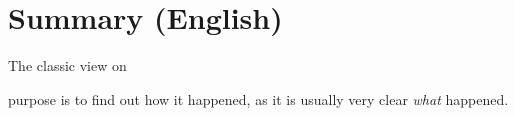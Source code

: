 \chapter{Summary (English)}
The classic view on 



purpose is to find out how it happened, as it is usually very clear \emph{what} happened.